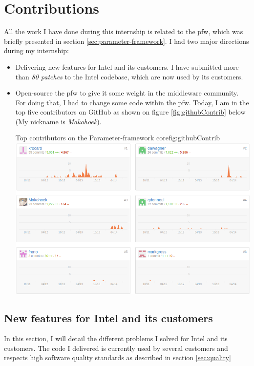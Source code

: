 \chapter{Contributions}\label{chap:contributions}

All the work I have done during this internship is related to the \gls{pfw},
which was briefly presented in section \ref{sec:parameter-framework}.
I had two major directions during my internship:
\begin{itemize}
    \item Delivering new features for Intel and its customers.
        I have submitted more than \emph{80 patches} to the Intel codebase, which are now used by its customers.
    \item Open-source the \gls{pfw} to give it some weight in the middleware community.
        For doing that, I had to change some code within the \gls{pfw}.
        Today, I am in the top five contributors on GitHub as shown on figure \ref{fig:githubContrib} below (My nickname is \emph{Makohoek}).
        \begin{figureGraphics}{Top contributors on the Parameter-framework core}{fig:githubContrib}
            \includegraphics[width=\textwidth]{./src/img/statsGitHub.png}
        \end{figureGraphics}
\end{itemize}

\section{New features for Intel and its customers}

In this section, I will detail the different problems I solved for Intel and its customers.
The code I delivered is currently used by several customers and respects high software quality standards
as described in section \ref{sec:quality}


